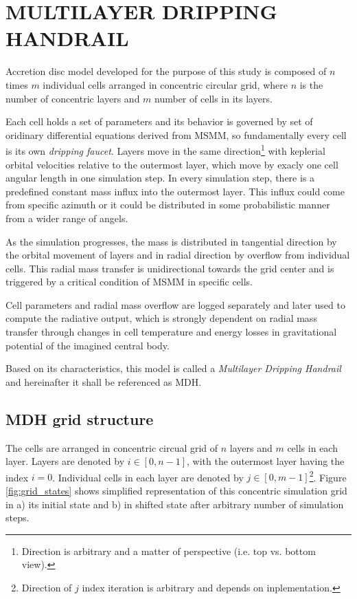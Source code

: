 \chapter{\color{red}MULTILAYER DRIPPING HANDRAIL}
\thispagestyle{empty}

Accretion disc model developed for the purpose of this study is composed of $n$ times $m$ individual cells arranged in concentric circular grid, where $n$ is the number of concentric layers and $m$ number of cells in its layers. 

Each cell holds a set of parameters and its behavior is governed by set of oridinary differential equations derived from MSMM, so fundamentally every cell is its own \emph{dripping faucet}. Layers move in the same direction\footnote{Direction is arbitrary and a matter of perspective (i.e. top vs. bottom view).} with keplerial orbital velocities relative to the outermost layer, which move by exacly one cell angular length in one simulation step. In every simulation step, there is a predefined constant mass influx into the outermost layer. This influx could come from specific azimuth or it could be distributed in some probabilistic manner from a wider range of angels.

As the simulation progresses, the mass is distributed in tangential direction by the orbital movement of layers and in radial direction by overflow from individual cells. This radial mass transfer is unidirectional towards the grid center and is triggered by a critical condition of MSMM in specific cells. 

Cell parameters and radial mass overflow are logged separately and later used to compute the radiative output, which is strongly dependent on radial mass transfer through changes in cell temperature and energy losses in gravitational potential of the imagined central body. 

Based on its characteristics, this model is called a \emph{Multilayer Dripping Handrail} and hereinafter it shall be referenced as MDH.

\section{MDH grid structure}

The cells are arranged in concentric circual grid of $n$ layers and $m$ cells in each layer. Layers are denoted by $i \in [0, n-1]$, with the outermost layer having the index $i = 0$. Individual cells in each layer are denoted by $j \in [0, m-1]$\footnote{Direction of $j$ index iteration is arbitrary and depends on inplementation.}. Figure \ref{fig:grid_states} shows simplified representation of this concentric simulation grid in a) its initial state and b) in shifted state after arbitrary number of simulation steps. 

